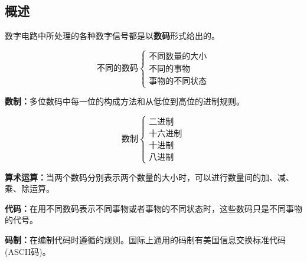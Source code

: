 \subsection{概述}

数字电路中所处理的各种数字信号都是以\textbf{数码}形式给出的。

\begin{equation*}
    \text{不同的数码}
    \left\{
    \begin{aligned}
        \text{不同数量的大小} \\
        \text{不同的事物}     \\
        \text{事物的不同状态}
    \end{aligned}
    \right.
\end{equation*}

\textbf{数制：}多位数码中每一位的构成方法和从低位到高位的进制规则。

\begin{equation*}
    \text{数制}
    \left\{
    \begin{aligned}
        \text{二进制}   \\
        \text{十六进制} \\
        \text{十进制}   \\
        \text{八进制}
    \end{aligned}
    \right.
\end{equation*}

\textbf{算术运算：}当两个数码分别表示两个数量的大小时，可以进行数量间的加、减、乘、除运算。

\textbf{代码：}在用不同数码表示不同事物或者事物的不同状态时，这些数码只是不同事物的代号。

\textbf{码制：}在编制代码时遵循的规则。国际上通用的码制有美国信息交换标准代码(ASCII码)。